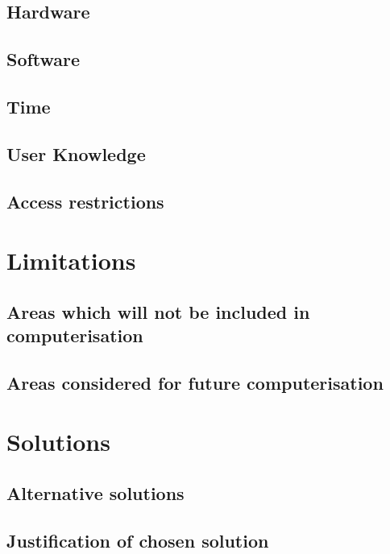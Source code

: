 \subsection{Hardware}

\subsection{Software}

\subsection{Time}

\subsection{User Knowledge}

\subsection{Access restrictions}

\section{Limitations}

\subsection{Areas which will not be included in computerisation}

\subsection{Areas considered for future computerisation}

\section{Solutions}

\subsection{Alternative solutions}

\subsection{Justification of chosen solution}
